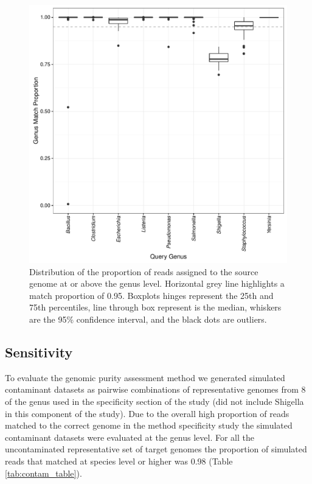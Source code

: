 \documentclass[fleqn,10pt,lineno]{wlpeerj}\usepackage[]{graphicx}\usepackage[]{color}
\makeatletter
\def\maxwidth{ %
  \ifdim\Gin@nat@width>\linewidth
    \linewidth
  \else
    \Gin@nat@width
  \fi
}
\newenvironment{knitrout}{}{} %
\makeatother
\begin{document}
\begin{knitrout}
\color{fgcolor}\begin{figure}
\includegraphics[width=\maxwidth]{figure/single_genus-1} \caption[Distribution of the proportion of reads assigned to the source genome at or above the genus level]{Distribution of the proportion of reads assigned to the source genome at or above the genus level. Horizontal grey line highlights a match proportion of 0.95. Boxplots hinges represent the 25th and 75th percentiles, line through box represent is the median, whiskers are the 95\% confidence interval, and the black dots are outliers.}\label{fig:single_genus}
\end{figure}


\end{knitrout}

\subsection*{Sensitivity}
To evaluate the genomic purity assessment method we generated simulated contaminant datasets as pairwise combinations of representative genomes from 8 of the genus used in the specificity section of the study (did not include Shigella in this component of the study). Due to the overall high proportion of reads matched to the correct genome in the method specificity study the simulated contaminant datasets were evaluated at the genus level. For all the uncontaminated representative set of target genomes the proportion of simulated reads that matched at species level or higher was 0.98 (Table \ref{tab:contam_table}).
\end{document}
